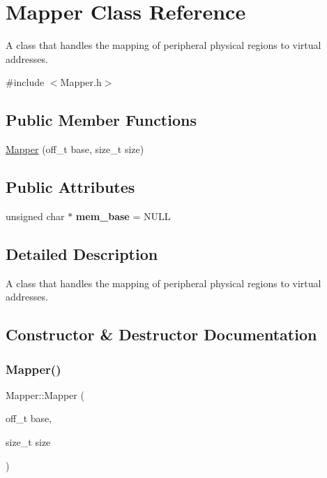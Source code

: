 \hypertarget{classMapper}{}\section{Mapper Class Reference}
\label{classMapper}


A class that handles the mapping of peripheral physical regions to virtual addresses.  




{\ttfamily \#include $<$Mapper.\+h$>$}

\subsection*{Public Member Functions}
\begin{DoxyCompactItemize}
\item 
\mbox{\hyperlink{classMapper_ad94bc5276f51985b51f72922f64bc19e}{Mapper}} (off\+\_\+t base, size\+\_\+t size)
\end{DoxyCompactItemize}
\subsection*{Public Attributes}
\begin{DoxyCompactItemize}
\item 
\mbox{\label{classMapper_afadadee19eb92436827f4f1e8c71a4e6}} 
unsigned char $\ast$ {\bfseries mem\+\_\+base} = N\+U\+LL
\end{DoxyCompactItemize}


\subsection{Detailed Description}
A class that handles the mapping of peripheral physical regions to virtual addresses. 

\subsection{Constructor \& Destructor Documentation}
\mbox{\label{classMapper_ad94bc5276f51985b51f72922f64bc19e}} 
\subsubsection{\texorpdfstring{Mapper()}{Mapper()}}
{\footnotesize\ttfamily Mapper\+::\+Mapper (\begin{DoxyParamCaption}\item[{off\+\_\+t}]{base,  }\item[{size\+\_\+t}]{size }\end{DoxyParamCaption})}

